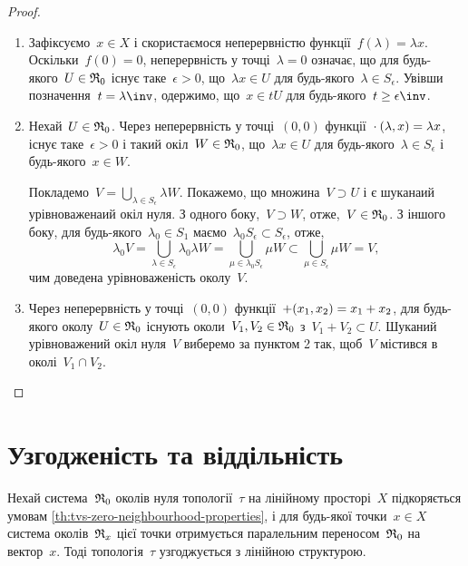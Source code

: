 \begin{proof}
    \listhack
    \begin{enumerate}
        \item Зафіксуємо~$x \in X$ і скористаємося неперервністю функції~$f(\lambda) = \lambda x$. Оскільки~$f(0) = 0$, неперервність у точці~$\lambda = 0$ означає, що для будь-якого~$U \in \frak R_0$ існує таке~$\epsilon > 0$, що~$\lambda x \in U$ для будь-якого~$\lambda \in S_\epsilon$. Увівши позначення~$t = \lambda\inv$, одержимо, що~$x \in t U$ для будь-якого~$t \ge \epsilon\inv$.

        \item Нехай~$U \in \frak R_0$. Через неперервність у точці~$(0, 0)$ функції~$\cdot\:(\lambda, x) = \lambda x$, існує таке~$\epsilon > 0$ і такий окіл~$W \in \frak R_0$, що~$\lambda x \in U$ для будь-якого~$\lambda \in S_\epsilon$ і будь-якого~$x \in W$.
        
        Покладемо~$V = \bigcup_{\lambda \in S_\epsilon} \lambda W$. Покажемо, що множина~$V \supset U$ і є шуканаий урівноваженаий окіл нуля. З одного боку,~$V \supset W$, отже,~$V \in \frak R_0$. З іншого боку, для будь-якого~$\lambda_0 \in S_1$ маємо~$\lambda_0 S_\epsilon \subset S_\epsilon$, отже,
        \begin{equation*}
            \lambda_0 V = \bigcup_{\lambda \in S_\epsilon} \lambda_0 \lambda W = \bigcup_{\mu \in \lambda_0 S_\epsilon} \mu W \subset \bigcup_{\mu \in S_\epsilon} \mu W = V,
        \end{equation*}
        чим доведена урівноваженість околу~$V$.
    
        \item Через неперервність у точці~$(0, 0)$ функції~$+(x_1, x_2) = x_1 + x_2$, для будь-якого околу~$U \in \frak R_0$ існують околи~$V_1, V_2 \in \frak R_0$ з~$V_1 + V_2 \subset U$. Шуканий урівноважений окіл нуля~$V$ виберемо за пунктом 2 так, щоб~$V$ містився в околі~$V_1 \cap V_2$. \qedhere
    \end{enumerate}
\end{proof}

\section{Узгодженість та віддільність}

\begin{theorem}
    Нехай система~$\frak R_0$ околів нуля топології~$\tau$ на лінійному просторі~$X$ підкоряється умовам \cref{th:tvs-zero-neighbourhood-properties}, і для будь-якої точки~$x \in X$ система околів~$\frak R_x$ цієї точки отримується паралельним переносом~$\frak R_0$ на вектор~$x$. Тоді топологія~$\tau$ узгоджується з лінійною структурою.
\end{theorem}

